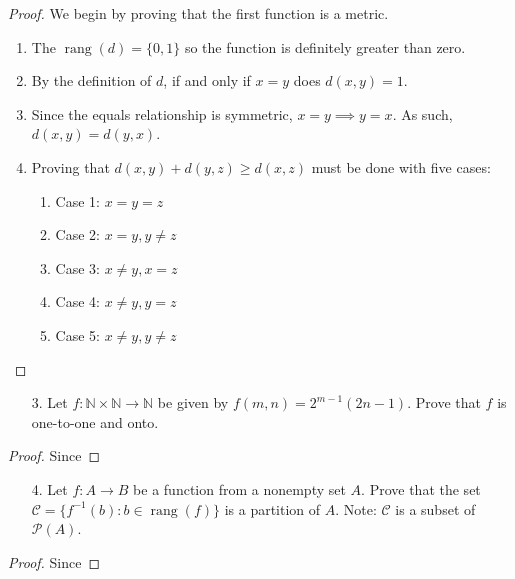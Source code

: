 \documentclass[10pt]{article}
\theoremstyle{definition}
\theoremstyle{plain}
\newcommand{\N}{\mathbb{N}}
\DeclareMathOperator\rang{rang}
\begin{document}
\begin{proof}
  We begin by proving that the first function is a metric.
  \begin{enumerate}
    \item The $\rang(d)=\{0,1\}$ so the function is definitely greater than zero.
    \item By the definition of $d$, if and only if $x=y$ does $d(x,y)=1$.
    \item Since the equals relationship is symmetric, $x=y \implies y=x$. As such, $d(x,y) = d(y,x)$.
    \item Proving that $d(x,y) + d(y,z) \geq d(x,z)$ must be done with five cases:
    \begin{enumerate}
      \item Case 1: $x=y=z$
      \item Case 2: $x=y, y\neq z$
      \item Case 3: $x\neq y, x=z$
      \item Case 4: $x\neq y, y=z$
      \item Case 5: $x\neq y, y\neq z$
    \end{enumerate}
  \end{enumerate}
\end{proof}



\pagebreak



\begin{enumerate}
\item[3.] Let $f: \N \times \N \to \N$ be given by $f(m,n) = 2^{m-1}(2n-1)$.  Prove that $f$ is one-to-one and onto.
\end{enumerate}



\begin{proof}
  Since
\end{proof}



\pagebreak



\begin{enumerate}
\item[4.] Let $f:A \to B$ be a function from a nonempty set $A$.  Prove that the set $ \mathcal{C} = \{f^{-1}(b): b \in \rang(f)\}$ is a partition of $A$.  Note:  $\mathcal{C}$ is a subset of $\mathscr{P}(A)$.
\end{enumerate}



\begin{proof}
  Since
\end{proof}
\end{document}
